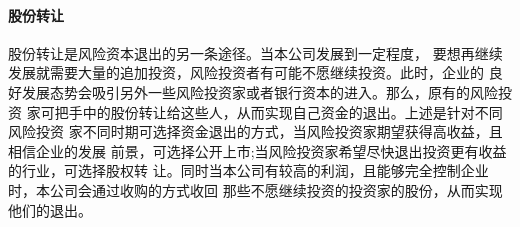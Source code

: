 \paragraph{股份转让}
股份转让是风险资本退出的另一条途径。当本公司发展到一定程度，
要想再继续发展就需要大量的追加投资，风险投资者有可能不愿继续投资。此时，企业的
良好发展态势会吸引另外一些风险投资家或者银行资本的进入。那么，原有的风险投资
家可把手中的股份转让给这些人，从而实现自己资金的退出。上述是针对不同风险投资
家不同时期可选择资金退出的方式，当风险投资家期望获得高收益，且相信企业的发展
前景，可选择公开上市;当风险投资家希望尽快退出投资更有收益的行业，可选择股权转
让。同时当本公司有较高的利润，且能够完全控制企业时，本公司会通过收购的方式收回
那些不愿继续投资的投资家的股份，从而实现他们的退出。
